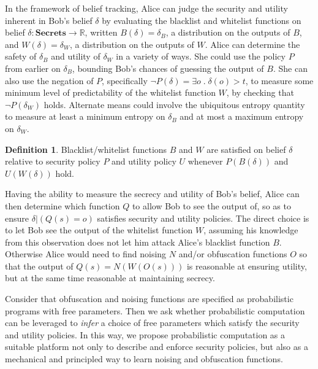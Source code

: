 \documentclass{article} %
\newcommand{\pxm}[1]{}
\newcommand{\ra}{\rightarrow}
\newcommand{\Real}{\mathbb{R}}
\newcommand{\secrets}[0]{\textbf{Secrets}}
\newcommand{\paren}[1]{\left( #1 \right)}
\newcommand{\cond}[0]{|}
\newcommand{\qsep}[0]{\; . \;}
\theoremstyle{plain} %
\theoremstyle{definition} %
\newtheorem*{definition-un}{Definition}
\begin{document}
In the framework of belief tracking, Alice can judge the security and
utility inherent in Bob's belief $ \delta $ by evaluating the
blacklist and whitelist functions on belief $ \delta : \secrets \ra
\Real $, written $ B(\delta) = \delta_B $, a distribution on the
outputs of $ B $, and $ W(\delta) = \delta_W$, a distribution on the
outputs of $ W $. Alice can determine the safety of $ \delta_B $ and utility of $
\delta_W $ in a variety of ways. She could use the policy $ P $ from
earlier on $ \delta_B $, bounding Bob's chances of guessing the output
of $ B $. She can also use the negation of $ P $, specifically $ \neg
P(\delta) = \exists o \qsep \delta(o) > t $, to measure some minimum
level of predictability of the whitelist function $ W $, by checking
that $ \neg P(\delta_W) $ holds. Alternate means could involve the
ubiquitous entropy quantity to measure at least a minimum entropy on $
\delta_B $ and at most a maximum entropy on $ \delta_W $.

\pxm{todo: There's an issue of accuracy of belief vs. uncertainty of belief. }

\pxm{todo: $ U(\delta) $ is not explicitly defined}

\begin{definition-un} Blacklist/whitelist functions $ B $ and $ W $
  are satisfied on belief $ \delta $ relative to security policy $ P $
  and utility policy $  U $ whenever $P(B(\delta))$ and $U(W(\delta))$ hold.
\end{definition-un}

Having the ability to measure the secrecy and utility of Bob's belief,
Alice can then determine which function $ Q $ to allow Bob to see the
output of, so as to ensure $ \delta \cond \paren{Q(s) = o} $ satisfies
security and utility policies. The direct choice is to let Bob see the
output of the whitelist function $ W $, assuming his knowledge from
this observation does not let him attack Alice's blacklist function $
B $. Otherwise Alice would need to find noising $ N $ and/or
obfuscation functions $ O $ so that the output of $ Q(s) = N(W(O(s)))
$ is reasonable at ensuring utility, but at the same time reasonable
at maintaining secrecy.

Consider that obfuscation and noising functions are specified as probabilistic programs
with free parameters. Then we ask whether probabilistic computation can be leveraged to
\emph{infer} a choice of free parameters which satisfy the security and utility policies.
In this way, we propose probabilistic computation as a suitable platform not only to
describe and enforce security policies, but also as a mechanical and principled way
 to learn noising and obfuscation functions.
 
\end{document}
